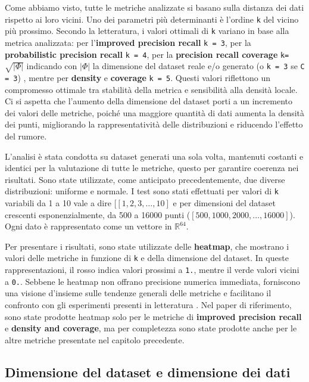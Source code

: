 Come abbiamo visto, tutte le metriche analizzate si basano sulla distanza dei dati rispetto ai loro vicini. Uno dei parametri più determinanti è l'ordine \texttt{k} del vicino più prossimo. Secondo la letteratura, i valori ottimali di \texttt{k} variano in base alla metrica analizzata: per l’\textbf{improved precision recall} \texttt{k = 3}, per la \textbf{probabilistic precision recall} \texttt{k = 4}, per la \textbf{precision recall coverage} \texttt{k=\(\sqrt{|\Phi|}\)} indicando con \(|\Phi|\) la dimensione del dataset reale e/o generato (o \texttt{k = 3} se \texttt{C = 3})
, mentre per \textbf{density} e \textbf{coverage} \texttt{k = 5}. Questi valori riflettono un compromesso ottimale tra stabilità della metrica e sensibilità alla densità locale. Ci si aspetta che l'aumento della dimensione del dataset porti a un incremento dei valori delle metriche, poiché una maggiore quantità di dati aumenta la densità dei punti, migliorando la rappresentatività delle distribuzioni e riducendo l’effetto del rumore.

L'analisi è stata condotta su dataset generati una sola volta, mantenuti costanti e identici per la valutazione di tutte le metriche, questo per garantire coerenza nei risultati. Sono state utilizzate, come anticipato precedentemente, due diverse distribuzioni: uniforme e normale. I test sono stati effettuati per valori di \texttt{k} variabili da 1 a 10 vale a dire \([[1,2,3,\dots,10]\) e per dimensioni del dataset crescenti esponenzialmente, da 500 a 16000 punti (\([500,1000,2000,\dots,16000]\)). Ogni dato è rappresentato come un vettore in \(\mathbb{R}^{64}\).

Per presentare i risultati, sono state utilizzate delle \textbf{heatmap}, che mostrano i valori delle metriche in funzione di \texttt{k} e della dimensione del dataset. In queste rappresentazioni, il rosso indica valori prossimi a \texttt{1.}, mentre il verde valori vicini a \texttt{0.}. Sebbene le heatmap non offrano precisione numerica immediata, forniscono una visione d’insieme sulle tendenze generali delle metriche e facilitano il confronto con gli esperimenti presenti in letteratura \cite{3ReliableFidelityDiversityMetrics}. Nel paper di riferimento, sono state prodotte heatmap solo per le metriche di \textbf{improved precision recall} e \textbf{density and coverage}, ma per completezza sono state prodotte anche per le altre metriche presentate nel capitolo precedente.

\subsection{Dimensione del dataset e dimensione dei dati}

